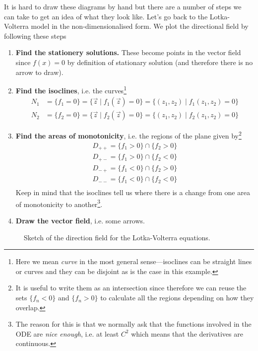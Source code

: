 It is hard to draw these diagrams by hand but there are a number of steps we
can take to get an idea of what they look like. Let's go back to the
Lotka-Volterra model in the non-dimensionalised form. We plot the directional
field by following these steps

\begin{enumerate}
  \item \textbf{Find the stationery solutions.} These become points in the vector field
    since $f(x) = 0$ by definition of stationary solution (and therefore there
    is no arrow to draw).
  \item \textbf{Find the isoclines}, i.e. the curves\footnote{Here we mean
    \textit{curve} in the most general sense---isoclines can be straight lines
  or curves and they can be disjoint as is the case in this example.}
    \begin{align*}
      N_1 &= \{f_1 = 0 \} = \{\vec{z} \mid f_1(\vec{z}) = 0\} = \{(z_1, z_2) \mid f_1(z_1,z_2) = 0\} \\
      N_2 &= \{f_2 = 0 \} = \{\vec{z} \mid f_2(\vec{z}) = 0\} = \{(z_1, z_2) \mid f_2(z_1,z_2) = 0\}
    \end{align*}
  \item \textbf{Find the areas of monotonicity}, i.e. the regions of the plane given
    by\footnote{It is useful to write them as an intersection since therefore
      we can reuse the sets $\{f_n < 0\}$ and $\{f_n > 0\}$ to calculate all
    the regions depending on how they overlap.}
    \begin{align*}
      D_{++} = \{f_1 > 0\} \cap \{f_2 > 0\} \\
      D_{+-} = \{f_1 > 0\} \cap \{f_2 < 0\} \\
      D_{-+} = \{f_1 < 0\} \cap \{f_2 > 0\} \\
      D_{--} = \{f_1 < 0\} \cap \{f_2 < 0\} \\
    \end{align*}
    Keep in mind that the isoclines tell us where there is a change from one
    area of monotonicity to another\footnote{The reason for this is that we
      normally ask that the functions involved in the ODE are \textit{nice
      enough}, i.e. at least $C^2$ which means that the derivatives are
    continuous.}.
  \item \textbf{Draw the vector field}, i.e. some arrows.
\end{enumerate}

\begin{figure}
  [h]

  \caption{Sketch of the direction field for the Lotka-Volterra equations.}
\end{figure}

